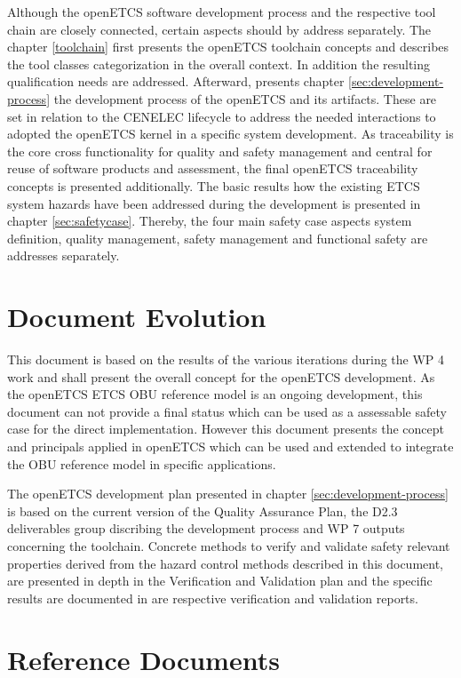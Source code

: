 \documentclass{template/openetcs_report}
\begin{document}
Although the openETCS software development process and the respective tool chain are closely connected, certain aspects should by address separately. The chapter \ref{toolchain} first presents the openETCS toolchain concepts and describes the tool classes categorization in the overall context. In addition the resulting qualification needs are addressed. Afterward, presents chapter \ref{sec:development-process} the development process of the openETCS and its artifacts. These are set in relation to the CENELEC lifecycle to address the needed interactions to adopted the openETCS kernel in a specific system development. As traceability is the core cross functionality for quality and safety management and central for reuse of software products and assessment, the final openETCS traceability concepts is presented additionally. The basic results how the existing ETCS system hazards have been addressed during the development is presented in chapter \ref{sec:safetycase}. Thereby, the four main safety case aspects system definition, quality management, safety management and functional safety are addresses separately.

\section{Document Evolution}

This document is based on the results of the various iterations during the WP 4 work and shall present the overall concept for the openETCS development. As the openETCS ETCS OBU reference model is an ongoing development, this document can not provide a final status which can be used as a assessable safety case for the direct implementation. However this document presents the concept and principals applied in openETCS which can be used and extended to integrate the OBU reference model in specific applications.

The openETCS development plan presented in chapter \ref{sec:development-process} is based on the current version of the Quality Assurance Plan, the D2.3 deliverables group discribing the development process and WP 7 outputs concerning the toolchain. Concrete methods to verify and validate safety relevant properties derived from the hazard control methods described in this document, are presented in depth   in the Verification and Validation plan and the specific results are documented in are respective verification and validation reports.

\section{Reference Documents}
\label{sec:refdoc}
\end{document}
